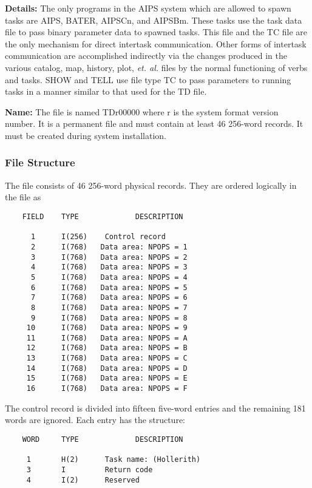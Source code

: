 {\bf Details:} The only programs in the AIPS system which are allowed
to spawn tasks are AIPS, BATER, AIPSCn, and AIPSBm.  These tasks use
the task data file to pass binary parameter data to spawned tasks.
This file and the TC file are the only mechanism for direct intertask
communication.  Other forms of intertask communication are
accomplished indirectly via the changes produced in the various
catalog, map, history, plot, {\it et. al.} files by the normal
functioning of verbs and tasks.  SHOW and TELL use file type TC to
pass parameters to running tasks in a manner similar to that used for
the TD file.

{\bf Name:}  The file is named TDr00000 where r is the system format
version number.  It is a permanent file and must
contain at least 46 256-word records.  It must be created during system
installation.

\subsubsection{File Structure}


     The file consists of 46 256-word physical records.  They are
ordered logically in the file as

\begin{verbatim}
    FIELD    TYPE             DESCRIPTION

      1      I(256)    Control record
      2      I(768)   Data area: NPOPS = 1
      3      I(768)   Data area: NPOPS = 2
      4      I(768)   Data area: NPOPS = 3
      5      I(768)   Data area: NPOPS = 4
      6      I(768)   Data area: NPOPS = 5
      7      I(768)   Data area: NPOPS = 6
      8      I(768)   Data area: NPOPS = 7
      9      I(768)   Data area: NPOPS = 8
     10      I(768)   Data area: NPOPS = 9
     11      I(768)   Data area: NPOPS = A
     12      I(768)   Data area: NPOPS = B
     13      I(768)   Data area: NPOPS = C
     14      I(768)   Data area: NPOPS = D
     15      I(768)   Data area: NPOPS = E
     16      I(768)   Data area: NPOPS = F
\end{verbatim}

The control record is divided into fifteen five-word entries and the
remaining 181 words are ignored.  Each entry has the structure:

\begin{verbatim}
    WORD     TYPE             DESCRIPTION

     1       H(2)      Task name: (Hollerith)
     3       I         Return code
     4       I(2)      Reserved
\end{verbatim}

